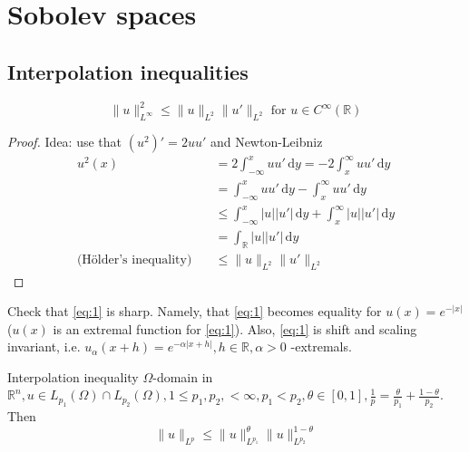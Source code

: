 \documentclass{report}
\begin{document}
\chapter{Sobolev spaces}
\section{Interpolation inequalities}

\begin{example}{}{}
    \begin{equation} \label{eq:1}
        \|u\|_{L^{\infty}}^{2} \leq \|u\|_{L^{2}} \|u'\|_{L^{2}} \text{ for } u \in C^{\infty}(\mathbb{R}) 
    \end{equation}
\end{example}

\begin{proof}
    Idea: use that \((u^2)' = 2uu'\) and Newton-Leibniz
    \begin{align*}
        u^2(x) &= 2 \int_{-\infty}^{x} u u' \,\mathrm{d}y = -2 \int_{x}^{\infty} u u' \,\mathrm{d}y \\
        &= \int_{-\infty}^{x} u u' \,\mathrm{d}y - \int_{x}^{\infty} u u' \,\mathrm{d}y \\
        & \leq \int_{-\infty}^{x} \vert u \vert \vert u' \vert \,\mathrm{d}y + \int_{x}^{\infty} \vert u \vert \vert u' \vert \,\mathrm{d}y \\
        &= \int_{\mathbb{R}} \vert u \vert \vert u' \vert \,\mathrm{d}y \\
        \text{(Hölder's inequality)} \quad & \leq \|u\|_{L^{2}} \|u'\|_{L^{2}}
    \end{align*}
\end{proof}

\qs{}
{
    Check that \ref{eq:1} is sharp. Namely, that \ref{eq:1} becomes equality for \(u(x) = e^{-\vert x \vert}\) (\(u(x)\) is an extremal function for \ref{eq:1}). Also, \ref{eq:1} is shift and scaling invariant, i.e. \(u_{\alpha}(x+h) = e^{-\alpha|x+h|}, h \in \mathbb{R}, \alpha>0\) -extremals.
}

\begin{example}{Interpolation inequality}{}
    \(\Omega\)-domain in \(\mathbb{R}^{n}, u \in L_{p_1}(\Omega) \cap L_{p_2}(\Omega), 1 \leq p_1, p_2, < \infty, p_1 < p_2, \theta \in [0, 1], \frac{1}{p} = \frac{\theta}{p_1} + \frac{1-\theta}{p_2}\). Then
    \begin{equation}\label{eq:2}
        \|u\|_{L^{p}} \leq \|u\|_{L^{p_1}}^{\theta} \|u\|_{L^{p_2}}^{1 - \theta}
    \end{equation} 
\end{example}
\end{document}

